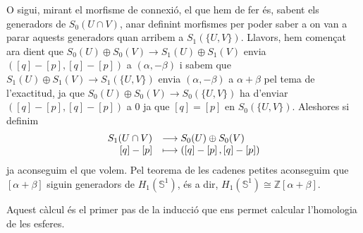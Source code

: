 \documentclass[../main.tex]{subfiles}
\begin{document}
O sigui, mirant el morfisme de connexió, el que hem de fer és, sabent els generadors de $S_0(U\cap V)$, anar definint morfismes per poder saber a on van a parar aquests generadors quan arribem a $S_1(\{U,V\})$. Llavors, hem començat ara dient que $S_0(U)\oplus S_0(V)\rightarrow S_1(U)\oplus S_1(V)$ envia $([q]-[p],[q]-[p])$ a $(\alpha,-\beta)$ i sabem que $S_1(U)\oplus S_1(V)\rightarrow S_1(\{U,V\})$ envia $(\alpha,-\beta)$ a $\alpha+\beta$ pel tema de l'exactitud, ja que $S_0(U)\oplus S_0(V)\rightarrow S_0(\{U,V\})$ ha d'enviar $([q]-[p],[q]-[p])$ a $0$ ja que $[q] = [p]$ en $S_0(\{U,V\})$. Aleshores si definim
\begin{equation}
    \notag
    \begin{array}{rl}
        S_1(U\cap V) & \longrightarrow S_0(U)\oplus S_0(V) \\
        \left[q\right]-\left[p\right] & \longmapsto (\left[q\right]-\left[p\right], \left[q\right]-\left[p\right])
    \end{array}
\end{equation}
ja aconseguim el que volem. Pel teorema de les cadenes petites aconseguim que $[\alpha+\beta]$ siguin generadors de $H_1(\mathbb{S}^1)$, és a dir, $H_1(\mathbb{S}^1)\cong \mathbb{Z}[\alpha+\beta]$.

Aquest càlcul és el primer pas de la inducció que ens permet calcular l'homologia de les esferes.
\end{document}
